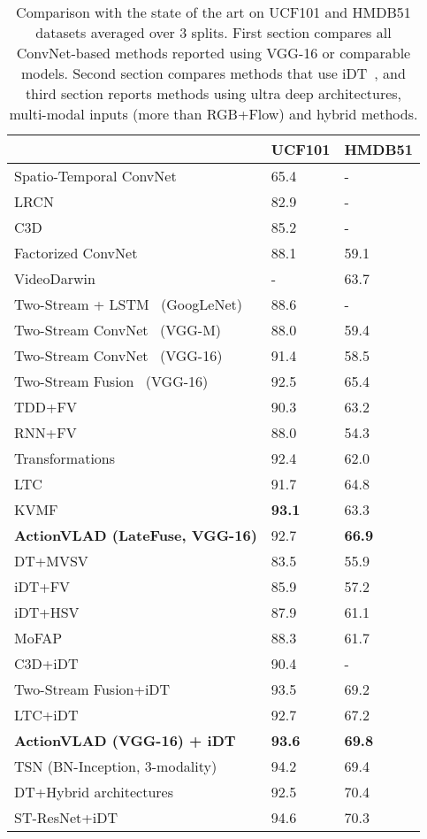 \documentclass[10pt,twocolumn,letterpaper]{article}
\newcommand{\methodTag}[0]{ActionVLAD}
\newcommand{\tableSize}[0]{\scriptsize}
\begin{document}
\begin{table}[]
\centering
\caption{Comparison with the state of the art
on UCF101 and HMDB51 datasets averaged 
over 3 splits. 
First section compares all ConvNet-based methods reported
using VGG-16 or comparable models.
Second section compares methods that use iDT~\cite{IDT_Wang_13},
and third section reports methods using ultra deep architectures,
multi-modal inputs (more than RGB+Flow) and 
hybrid methods.
}
\label{tab:main-compare}
\tableSize{}
\begin{tabular}{lll}
\toprule
                                        & UCF101 & HMDB51 \\ \midrule
Spatio-Temporal ConvNet~\cite{Karpathy_14} & 65.4 & - \\
LRCN~\cite{LRCN} & 82.9 & - \\
C3D~\cite{Tran_15}                             & 85.2 & -      \\
Factorized ConvNet~\cite{Sun15}              & 88.1 & 59.1 \\
VideoDarwin~\cite{Fernando_15} & - & 63.7 \\
Two-Stream + LSTM~\cite{Ng_15} (GoogLeNet)   & 88.6 & -      \\
Two-Stream ConvNet~\cite{Simonyan_14b} (VGG-M)      & 88.0 & 59.4 \\
Two-Stream ConvNet~\cite{WangL_15_GoodPrac,WangX_16a} (VGG-16)     & 91.4 & 58.5 \\
Two-Stream Fusion~\cite{Feichtenhofer_16} (VGG-16)	        & 92.5  & 65.4 \\
TDD+FV~\cite{WangL_15a}  & 90.3 & 63.2 \\
RNN+FV~\cite{Lev16} & 88.0 & 54.3 \\
Transformations~\cite{WangX_16a} & 92.4 & 62.0 \\
LTC~\cite{Varol_16} & 91.7 & 64.8 \\
KVMF~\cite{Zhu_15} & {\bf 93.1} & 63.3 \\
{\bf \methodTag{} (LateFuse, VGG-16)}                  & 92.7  & {\bf 66.9} \\ 
\midrule
DT+MVSV~\cite{Cai_14} &  83.5 & 55.9 \\
iDT+FV~\cite{IDT_Wang_13} & 85.9 & 57.2 \\
iDT+HSV~\cite{Peng_16} & 87.9 & 61.1 \\
MoFAP~\cite{WangL_16b} & 88.3 & 61.7 \\
  C3D+iDT~\cite{Tran_15} & 90.4 & - \\
Two-Stream Fusion+iDT~\cite{Feichtenhofer_16}        & 93.5  & 69.2 \\
LTC+iDT~\cite{Varol_16} & 92.7 & 67.2 \\
{\bf \methodTag{} (VGG-16) + iDT} & {\bf 93.6} & {\bf 69.8} \\
\midrule
TSN (BN-Inception, 3-modality)~\cite{WangL_16a}  &  94.2 & 69.4 \\
DT+Hybrid architectures~\cite{deSouza_16} & 92.5  & 70.4 \\
ST-ResNet+iDT~\cite{Feichtenhofer_16b} & 94.6 & 70.3 \\
\bottomrule
\end{tabular}
\end{table}
\end{document}
